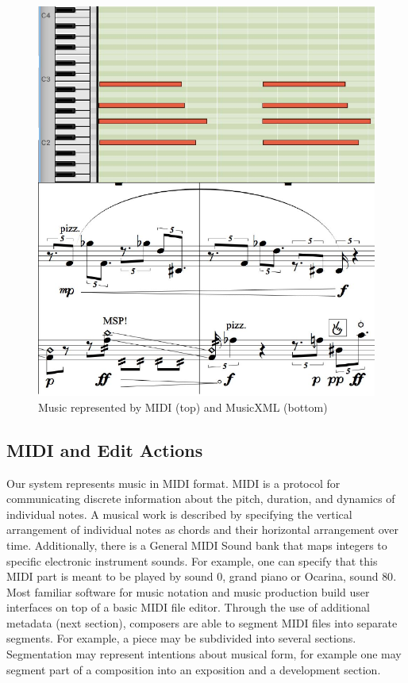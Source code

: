 \documentclass[final,authoryear,5p,times,twocolumn]{elsarticle}
\begin{document}
\begin{figure}
	\centering
	\includegraphics[scale=0.5]{midi.pdf}
	\caption{Music represented by MIDI (top) and MusicXML (bottom)}
	\label{fig:midi}
\end{figure}

\subsection{MIDI and Edit Actions}
\label{subsec:editActions}

Our system represents music in MIDI format. MIDI is a protocol for communicating discrete information about the pitch, duration, and dynamics of individual notes. A musical work is described by specifying the vertical arrangement of individual notes as chords and their horizontal arrangement over time. Additionally, there is a General MIDI Sound bank that maps integers to specific electronic instrument sounds. For example, one can specify that this MIDI part is meant to be played by sound $0$, grand piano or Ocarina, sound $80$. Most familiar software for music notation and music production build user interfaces on top of a basic MIDI file editor. Through the use of additional metadata (next section), composers are able to segment MIDI files into separate segments. For example, a piece may be subdivided into several sections. Segmentation may represent intentions about musical form, for example one may segment part of a composition into an exposition and a development section. 
\end{document}

